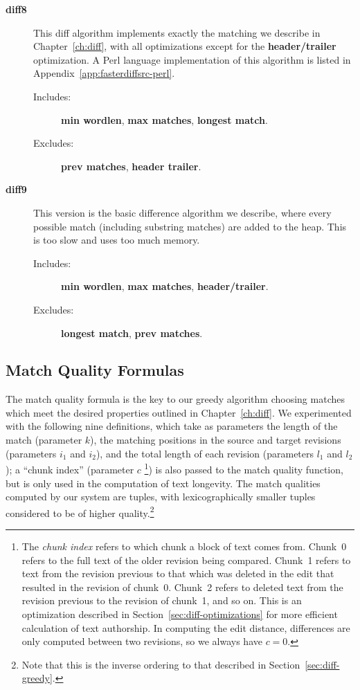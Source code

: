 \begin{description}
\item[\textbf{diff8}]
    This diff algorithm implements exactly the matching
    we describe in Chapter~\ref{ch:diff}, with all optimizations except
    for the \textbf{header/trailer} optimization.
    A Perl language implementation of
    this algorithm is listed in Appendix~\ref{app:fasterdiffsrc-perl}.
    \begin{description}
    \item[Includes:]
	\textbf{min wordlen}, \textbf{max matches}, \textbf{longest match}.
    \item[Excludes:]
	\textbf{prev matches}, \textbf{header trailer}.
    \end{description}

\item[\textbf{diff9}]
    This version is the basic difference algorithm we describe,
    where every possible match (including substring matches) are
    added to the heap.  This is too slow and uses too much memory.
    \begin{description}
    \item[Includes:]
	\textbf{min wordlen}, \textbf{max matches},
	\textbf{header/trailer}.
    \item[Excludes:]
	\textbf{longest match}, \textbf{prev matches}.
    \end{description}

\end{description}



\subsection{Match Quality Formulas}

The match quality formula is the key to our greedy algorithm
choosing matches which meet the desired properties outlined
in Chapter~\ref{ch:diff}.
We experimented with the following nine definitions,
which take as parameters the length of the match (parameter $k$),
the matching positions in the source and target revisions
(parameters $i_1$ and $i_2$), and the total length of
each revision (parameters $l_1$ and $l_2$);
a ``chunk index'' (parameter $c$
\footnote{The \textit{chunk index} refers
to which chunk a block of text comes from.
Chunk~0 refers to the full text of the older revision being compared.
Chunk~1 refers to text from the revision previous to that which was
deleted in the edit that resulted in the revision of chunk~0.
Chunk~2 refers to deleted text from the revision previous to the
revision of chunk~1, and so on.
This is an optimization described in Section~\ref{sec:diff-optimizations}
for more efficient calculation of text authorship.
In computing the edit distance, differences are only computed
between two revisions, so we always have $c=0$.
}) is also passed to the match quality function,
but is only used in the computation of text longevity.
The match qualities computed by our system are tuples,
with lexicographically smaller tuples considered to be
of higher quality.\footnote{Note that this is the inverse ordering
to that described in Section~\ref{sec:diff-greedy}.}


